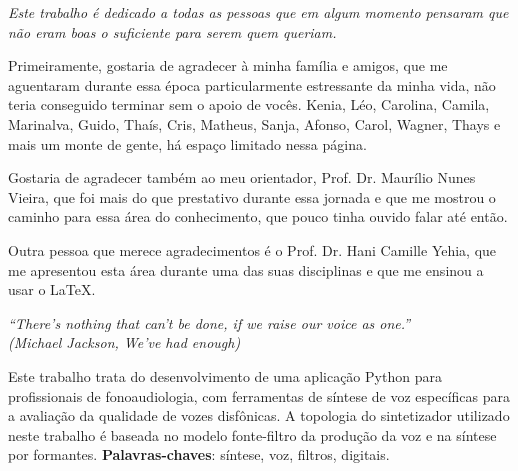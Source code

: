 \documentclass[
  12pt,       
  openright,      
  twoside,      
  a4paper,      
  english,      
  french,       
  spanish,      
  brazil,     
  ]{abntex2}
\begin{document}
\frenchspacing 
\pretextual

\imprimircapa
\imprimirfolhaderosto

\begin{dedicatoria}
   \vspace*{\fill}
   \centering
   \noindent
   \textit{Este trabalho é dedicado a todas as pessoas que em algum momento pensaram que não eram boas o suficiente para serem quem queriam.} \vspace*{\fill}
\end{dedicatoria}

\begin{agradecimentos}
Primeiramente, gostaria de agradecer à minha família e amigos, que me aguentaram durante essa época particularmente estressante da minha vida, não teria conseguido terminar sem o apoio de vocês. Kenia, Léo, Carolina, Camila, Marinalva, Guido, Thaís, Cris, Matheus, Sanja, Afonso, Carol, Wagner, Thays e mais um monte de gente, há espaço limitado nessa página.

Gostaria de agradecer também ao meu orientador, Prof. Dr. Maurílio Nunes Vieira, que foi mais do que prestativo durante essa jornada e que me mostrou o caminho para essa área do conhecimento, que pouco tinha ouvido falar até então.

Outra pessoa que merece agradecimentos é o Prof. Dr. Hani Camille Yehia, que me apresentou esta área durante uma das suas disciplinas e que me ensinou a usar o LaTeX.
\end{agradecimentos}

\begin{epigrafe}
   \vspace*{\fill}
  \begin{flushright}
    \textit{``There's nothing that can't be done, if we raise our voice as one.''\\
    (Michael Jackson, We've had enough)}
  \end{flushright}
\end{epigrafe}

\setlength{\absparsep}{18pt}
\begin{resumo}
Este trabalho trata do desenvolvimento de uma aplicação Python para profissionais de fonoaudiologia, com ferramentas de síntese de voz específicas para  a avaliação da qualidade de vozes disfônicas. A topologia do sintetizador utilizado neste trabalho é baseada no modelo fonte-filtro da produção da voz e na síntese por formantes.
 \textbf{Palavras-chaves}: síntese, voz, filtros, digitais.
\end{resumo}
\end{document}
